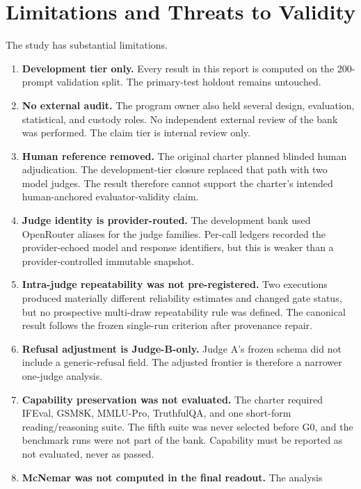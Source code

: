 \documentclass[9pt,letterpaper,twocolumn]{extarticle}
\providecommand{\tightlist}{\setlength{\itemsep}{0pt}\setlength{\parskip}{0pt}}
\begin{document}
\section{Limitations and Threats to
Validity}\label{limitations-and-threats-to-validity}

The study has substantial limitations.

\begin{enumerate}
\def\labelenumi{\arabic{enumi}.}
\tightlist
\item
  \textbf{Development tier only.} Every result in this report is
  computed on the 200-prompt validation split. The primary-test holdout
  remains untouched.
\item
  \textbf{No external audit.} The program owner also held several
  design, evaluation, statistical, and custody roles. No independent
  external review of the bank was performed. The claim tier is internal
  review only.
\item
  \textbf{Human reference removed.} The original charter planned blinded
  human adjudication. The development-tier closure replaced that path
  with two model judges. The result therefore cannot support the
  charter's intended human-anchored evaluator-validity claim.
\item
  \textbf{Judge identity is provider-routed.} The development bank used
  OpenRouter aliases for the judge families. Per-call ledgers recorded
  the provider-echoed model and response identifiers, but this is weaker
  than a provider-controlled immutable snapshot.
\item
  \textbf{Intra-judge repeatability was not pre-registered.} Two
  executions produced materially different reliability estimates and
  changed gate status, but no prospective multi-draw repeatability rule
  was defined. The canonical result follows the frozen single-run
  criterion after provenance repair.
\item
  \textbf{Refusal adjustment is Judge-B-only.} Judge A's frozen schema
  did not include a generic-refusal field. The adjusted frontier is
  therefore a narrower one-judge analysis.
\item
  \textbf{Capability preservation was not evaluated.} The charter
  required IFEval, GSM8K, MMLU-Pro, TruthfulQA, and one short-form
  reading/reasoning suite. The fifth suite was never selected before G0,
  and the benchmark runs were not part of the bank. Capability must be
  reported as not evaluated, never as passed.
\item
  \textbf{McNemar was not computed in the final readout.} The analysis

\end{enumerate}
\end{document}
